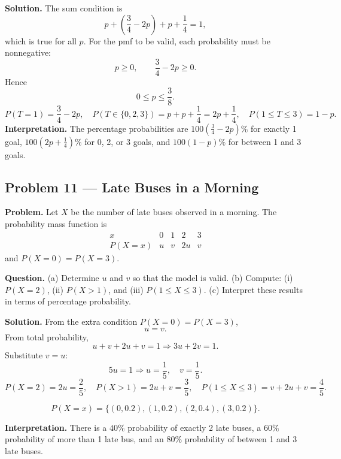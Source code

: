 \begin{ExamProblems}
		\textbf{Solution.}
		The sum condition is
		\[
		p+\left(\frac{3}{4}-2p\right)+p+\frac{1}{4}=1,
		\]
		which is true for all $p$.
		For the pmf to be valid, each probability must be nonnegative:
		\[
		p\ge 0,\qquad \frac{3}{4}-2p\ge 0.
		\]
		Hence
		\[
		0\le p\le \frac{3}{8}.
		\]
		\[
		P(T=1)=\frac{3}{4}-2p,\quad
		P(T\in\{0,2,3\})=p+p+\frac{1}{4}=2p+\frac{1}{4},\quad
		P(1\le T\le 3)=1-p.
		\]
		\textbf{Interpretation.} The percentage probabilities are $100\left(\frac{3}{4}-2p\right)\%$ for exactly 1 goal, $100\left(2p+\frac{1}{4}\right)\%$ for 0, 2, or 3 goals, and $100(1-p)\%$ for between 1 and 3 goals.
		
		
		\item
		\subsection*{Problem 11 — Late Buses in a Morning}
		
		\textbf{Problem.}
		Let $X$ be the number of late buses observed in a morning. The probability mass function is
		\[
		\begin{array}{c|cccc}
			x & 0 & 1 & 2 & 3\\
			\hline
			P(X=x) & u & v & 2u & v
		\end{array}
		\]
		and $P(X=0)=P(X=3)$.
		
		\textbf{Question.}
		(a) Determine $u$ and $v$ so that the model is valid.
		(b) Compute: (i) $P(X=2)$, (ii) $P(X>1)$, and (iii) $P(1\le X\le 3)$.
		(c) Interpret these results in terms of percentage probability.
		
		\textbf{Solution.}
		From the extra condition $P(X=0)=P(X=3)$,
		\[
		u=v.
		\]
		From total probability,
		\[
		u+v+2u+v=1\Rightarrow 3u+2v=1.
		\]
		Substitute $v=u$:
		\[
		5u=1\Rightarrow u=\frac{1}{5},\quad v=\frac{1}{5}.
		\]
		\[
		P(X=2)=2u=\frac{2}{5},\quad
		P(X>1)=2u+v=\frac{3}{5},\quad
		P(1\le X\le 3)=v+2u+v=\frac{4}{5}.
		\]
		
\[
		P(X=x)=\{(0,0.2),(1,0.2),(2,0.4),(3,0.2)\}.
		\]
\begin{center}
		\end{center}
\textbf{Interpretation.} There is a $40\%$ probability of exactly 2 late buses, a $60\%$ probability of more than 1 late bus, and an $80\%$ probability of between 1 and 3 late buses.
		

\end{ExamProblems}
